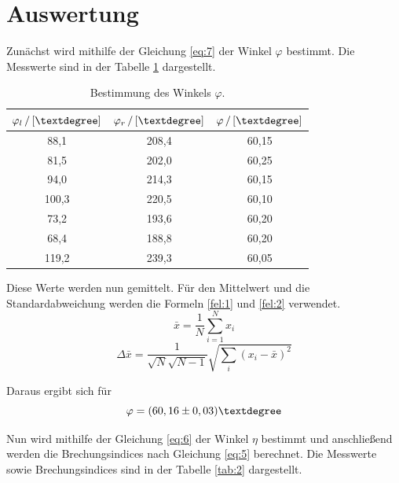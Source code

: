 \section{Auswertung}
Zunächst wird mithilfe der Gleichung \ref{eq:7} der Winkel $\varphi$ bestimmt.
Die Messwerte sind in der Tabelle \ref{tab:1} dargestellt.
\begin{table}[H]
  \centering
  \caption{Bestimmung des Winkels $\varphi$.}
  \label{tab:1}
  \begin{tabular}{c c c}
    \toprule
    $\varphi_l\,/\,[\textdegree]$ & $\varphi_r\,/\,[\textdegree]$ & $\varphi \,/\,[\textdegree]$\\
    \midrule
    88,1 &208,4 &60,15\\
    81,5 &202,0 &60,25\\
    94,0 &214,3 &60,15\\
    100,3& 220,5& 60,10\\
    73,2 &193,6 &60,20\\
    68,4 &188,8 &60,20\\
    119,2& 239,3& 60,05\\
    \bottomrule
  \end{tabular}
\end{table}
Diese Werte werden nun gemittelt.
Für den Mittelwert und die Standardabweichung werden die Formeln \ref{fel:1} und \ref{fel:2} verwendet.
\begin{equation}
    \bar{x} = \frac{1}{N} \sum_{i=1}^{N} x_i
    \label{fel:1}
\end{equation}
\begin{equation}
  \Delta \bar{x} = \frac{1}{\sqrt{N}\sqrt{N-1}} \sqrt{\sum_{i}(x_i-\bar{x})^2}
  \label{fel:2}
\end{equation}

Daraus ergibt sich für
\begin{equation*}
  \varphi = (60,16\pm0,03)\textdegree
\end{equation*}

Nun wird mithilfe der Gleichung \ref{eq:6} der Winkel $\eta$ bestimmt und anschließend werden
die Brechungsindices nach Gleichung \ref{eq:5} berechnet.
Die Messwerte sowie Brechungsindices sind in der Tabelle \ref{tab:2} dargestellt.

